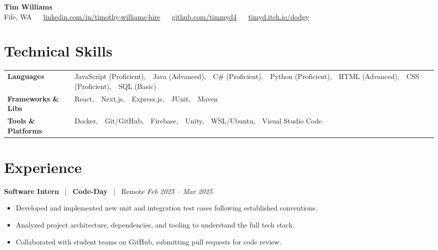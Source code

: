 \documentclass[10pt, letterpaper]{article}
\newcommand{\jobhead}[4]{%
  \vspace{5pt}%
  {\bfseries\color{dark}#1}%
  ~{\color{light}|}~%
  {\bfseries\color{navy}#2}%
  ~{\color{light}|}~%
  {\color{light}#3}%
  \hfill{\color{light}\small\textit{#4}}\\[-2pt]%
}
\newcommand{\skillrow}[2]{%
  {\bfseries #1} & #2 \\[2pt]%
}
\begin{document}

\begin{center}
  {\huge\bfseries\color{navy} Tim Williams}\\[4pt]
  {\small\color{light}
    Fife, WA
    ~\textbullet~
    \href{https://linkedin.com/in/timothy-williams-hire}{linkedin.com/in/timothy-williams-hire}
    ~\textbullet~
    \href{https://github.com/timmyd4}{github.com/timmyd4}
    ~\textbullet~
    \href{https://timyd.itch.io/dodgy}{timyd.itch.io/dodgy}
  }
\end{center}

\vspace{2pt}

\section{Technical Skills}

\begin{tabular}{@{}p{1.6in} p{5.2in}@{}}
  \skillrow{Languages}{JavaScript (Proficient),\ \ Java (Advanced),\ \ C\# (Proficient),\ \ Python (Proficient),\ \ HTML (Advanced),\ \ CSS (Proficient),\ \ SQL (Basic)}
  \skillrow{Frameworks \& Libs}{React,\ \ Next.js,\ \ Express.js,\ \ JUnit,\ \ Maven}
  \skillrow{Tools \& Platforms}{Docker,\ \ Git/GitHub,\ \ Firebase,\ \ Unity,\ \ WSL/Ubuntu,\ \ Visual Studio Code}
\end{tabular}

\section{Experience}

\jobhead{Software Intern}{Code-Day}{Remote}{Feb 2025 – Mar 2025}
\begin{itemize}
  \item Developed and implemented new unit and integration test cases following established conventions.
  \item Analyzed project architecture, dependencies, and tooling to understand the full tech stack.
  \item Collaborated with student teams on GitHub, submitting pull requests for code review.
\end{itemize}
\end{document}
